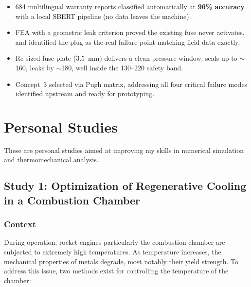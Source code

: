 \documentclass[11pt,a4paper]{article}
\begin{document}
\begin{tcolorbox}[colback=accentcolor!10,colframe=accentcolor,title=Key Outcomes]
\begin{itemize}[leftmargin=*]
    \item 684 multilingual warranty reports classified automatically at \textbf{96\% accuracy} with a local SBERT pipeline (no data leaves the machine).
    \item FEA with a geometric leak criterion proved the existing fuse never activates, and identified the plug as the real failure point matching field data exactly.
    \item Re-sized fuse plate (3.5~mm) delivers a clean pressure window: seals up to $\sim$160, leaks by $\sim$180, well inside the 130--220 safety band.
    \item Concept~3 selected via Pugh matrix, addressing all four critical failure modes identified upstream and ready for prototyping.
\end{itemize}
\end{tcolorbox}

\newpage

\section{Personal Studies}

\begin{tcolorbox}[colback=gray!10,colframe=primarycolor,title=Note]
These are personal studies aimed at improving my skills in numerical simulation and thermomechanical analysis.
\end{tcolorbox}

\subsection{Study 1: Optimization of Regenerative Cooling in a Combustion Chamber}

\subsubsection{Context}

During operation, rocket engines particularly the combustion chamber are subjected to extremely high temperatures. As temperature increases, the mechanical properties of metals degrade, most notably their yield strength. To address this issue, two methods exist for controlling the temperature of the chamber:
\end{document}

